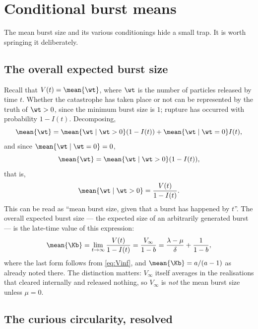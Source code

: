\section{Conditional burst means}
\label{sec:cond-means}

The mean burst size and its various conditionings hide a small trap. It is
worth springing it deliberately.

\subsection{The overall expected burst size}

Recall that $V(t)=\mean{\wt}$, where $\wt$ is the number of particles
released by time $t$. Whether the catastrophe has taken place or not can be
represented by the truth of $\wt>0$, since the minimum burst size is $1$;
rupture has occurred with probability $1-I(t)$. Decomposing,
$$\mean{\wt} = \mean{\wt\mid\wt > 0}(1-I(t)) + {\mean{\wt \mid \wt = 0}}I(t),$$
and since ${\mean{\wt \mid \wt = 0}} = 0$,
$$\mean{\wt} = \mean{\wt\mid\wt > 0}(1-I(t)),$$
that is,
\begin{equation}
\mean{\wt\mid\wt > 0} = \frac{V(t)}{1-I(t)}.
\label{eq:VoverI}
\end{equation}
This can be read as ``mean burst size, given that a burst has happened by
$t$''. The overall expected burst size --- the expected size of an
arbitrarily generated burst --- is the late-time value of this expression:
\begin{equation}
\mean{\Kb}=\lim_{t\to\infty}\frac{V(t)}{1-I(t)}
=\frac{V_\infty}{1-b}
=\frac{\lambda-\mu}{\delta}+\frac{1}{1-b},
\label{eq:meanK}
\end{equation}
where the last form follows from \eqref{eq:Vinf}, and $\mean{\Kb}=a/(a-1)$
as already noted there. The distinction matters:
$V_\infty$ itself averages in the realisations that cleared internally and
released nothing, so $V_\infty$ is \emph{not} the mean burst size unless
$\mu=0$.

\subsection{The curious circularity, resolved}
\label{sec:circularity}

